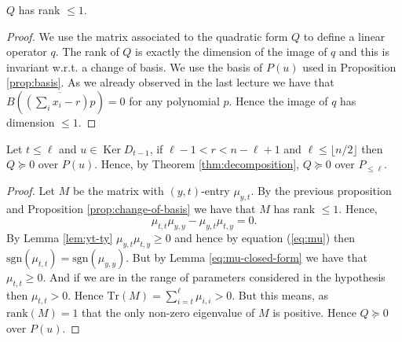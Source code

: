 \documentclass[a4paper,twoside,justified]{tufte-handout}
\DeclareMathOperator{\Ker}{Ker}
\newcommand{\sgn}{\mathrm{sgn}}
\begin{document}
\begin{proposition}
$Q$ has rank $\leq 1$.
\end{proposition}

\begin{proof}
We use the matrix associated to the quadratic form $Q$ to define a linear operator $q$. The rank of $Q$ is exactly the dimension of the image of $q$ and this is invariant w.r.t. a change of basis. We use the basis of $P(u)$ used in Proposition \ref{prop:basis}. As we already observed in the last lecture we have that $B(\overline{(\sum_i x_i -r)p})=0$ for any polynomial $p$. Hence the image of $q$ has dimension $\leq 1$.
\end{proof}

\begin{theorem}
Let $t\leq \ell$ and $u\in \Ker D_{t-1}$, if $\ell -1 < r < n-\ell +1$ and $\ell \leq \lfloor n/2 \rfloor$ then $Q\succeq 0$ over $P(u)$. Hence, by Theorem \ref{thm:decomposition}, $Q\succeq 0$ over $P_{\leq \ell}$.
\end{theorem}
\begin{proof}
Let $M$ be the matrix with $(y,t)$-entry $\mu_{y,t}$. By the previous proposition and Proposition \ref{prop:change-of-basis} we have that $M$ has rank $\leq 1$. Hence,
\begin{equation}\label{eq:mu}
\mu_{t,t}\mu_{y,y}-\mu_{y,t}\mu_{t,y}=0.
\end{equation}
 By Lemma \ref{lem:yt-ty} $\mu_{y,t}\mu_{t,y}\geq 0$ and hence by equation (\ref{eq:mu}) then $\sgn (\mu_{t,t})=\sgn(\mu_{y,y})$. But by Lemma \ref{eq:mu-closed-form} we have that $\mu_{t,t}\geq 0$.  And if we are in the range of parameters considered in the hypothesis then $\mu_{t,t}>0$. Hence $\mathrm{Tr}(M)=\sum_{i=t}^\ell \mu_{i,i}> 0$. But this means, as $\mathrm{rank}(M)=1$ that the only non-zero eigenvalue of $M$ is positive. Hence $Q\succeq 0$ over $P(u).$
\end{proof}




\end{document}
